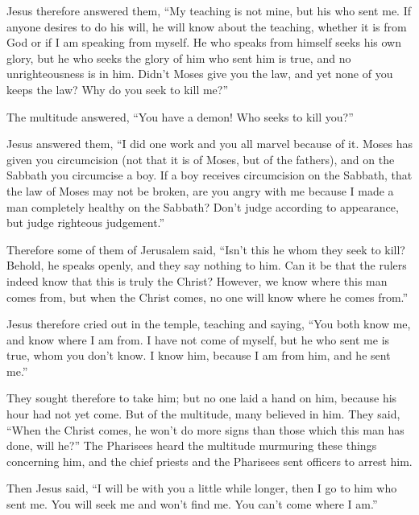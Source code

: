  Jesus therefore answered them, ``My teaching is not
mine, but his who sent me.  If anyone desires to do his
will, he will know about the teaching, whether it is from God or if I am
speaking from myself.  He who speaks from himself seeks
his own glory, but he who seeks the glory of him who sent him is true,
and no unrighteousness is in him.  Didn't Moses give you
the law, and yet none of you keeps the law? Why do you seek to kill
me?''

 The multitude answered, ``You have a demon! Who seeks to
kill you?''

 Jesus answered them, ``I did one work and you all marvel
because of it.  Moses has given you circumcision (not
that it is of Moses, but of the fathers), and on the Sabbath you
circumcise a boy.  If a boy receives circumcision on the
Sabbath, that the law of Moses may not be broken, are you angry with me
because I made a man completely healthy on the Sabbath? 
Don't judge according to appearance, but judge righteous judgement.''

 Therefore some of them of Jerusalem said, ``Isn't this
he whom they seek to kill?  Behold, he speaks openly, and
they say nothing to him. Can it be that the rulers indeed know that this
is truly the Christ?  However, we know where this man
comes from, but when the Christ comes, no one will know where he comes
from.''

 Jesus therefore cried out in the temple, teaching and
saying, ``You both know me, and know where I am from. I have not come of
myself, but he who sent me is true, whom you don't know. 
I know him, because I am from him, and he sent me.''

 They sought therefore to take him; but no one laid a
hand on him, because his hour had not yet come.  But of
the multitude, many believed in him. They said, ``When the Christ comes,
he won't do more signs than those which this man has done, will he?''
 The Pharisees heard the multitude murmuring these things
concerning him, and the chief priests and the Pharisees sent officers to
arrest him.

 Then Jesus said, ``I will be with you a little while
longer, then I go to him who sent me.  You will seek me
and won't find me. You can't come where I am.''

